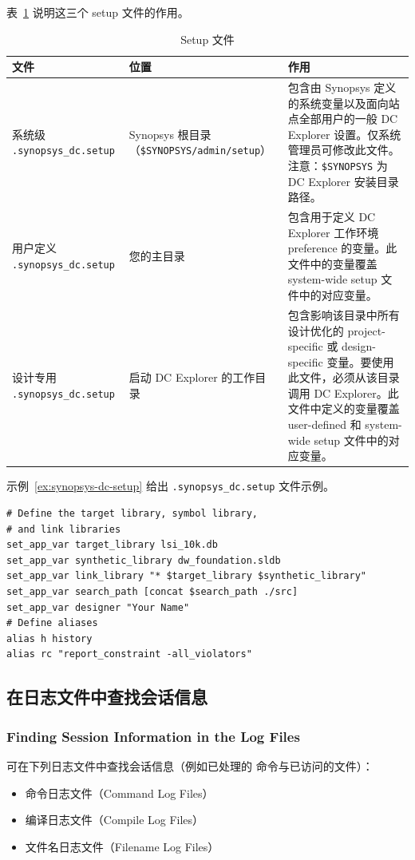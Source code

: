 表~\ref{tab:dce-setup-files} 说明这三个 setup 文件的作用。

\begin{table}[htbp]
\centering
\caption{Setup 文件}
\label{tab:dce-setup-files}
\begin{tabularx}{\textwidth}{@{}l l X@{}}
\toprule
\textbf{文件} & \textbf{位置} & \textbf{作用} \\
\midrule
系统级 \texttt{.synopsys\_dc.setup} &
Synopsys 根目录（\texttt{\$SYNOPSYS/admin/setup}） &
包含由 Synopsys 定义的系统变量以及面向站点全部用户的一般 DC Explorer 设置。仅系统管理员可修改此文件。注意：\texttt{\$SYNOPSYS} 为 DC Explorer 安装目录路径。 \\
用户定义 \texttt{.synopsys\_dc.setup} &
您的主目录 &
包含用于定义 DC Explorer 工作环境 preference 的变量。此文件中的变量覆盖 system-wide setup 文件中的对应变量。 \\
设计专用 \texttt{.synopsys\_dc.setup} &
启动 DC Explorer 的工作目录 &
包含影响该目录中所有设计优化的 project-specific 或 design-specific 变量。要使用此文件，必须从该目录调用 DC Explorer。此文件中定义的变量覆盖 user-defined 和 system-wide setup 文件中的对应变量。 \\
\bottomrule
\end{tabularx}
\end{table}

示例~\ref{ex:synopsys-dc-setup} 给出 \texttt{.synopsys\_dc.setup} 文件示例。

\begin{lstlisting}[caption={.synopsys\_dc.setup 文件},label={ex:synopsys-dc-setup}]
# Define the target library, symbol library,
# and link libraries
set_app_var target_library lsi_10k.db
set_app_var synthetic_library dw_foundation.sldb
set_app_var link_library "* $target_library $synthetic_library"
set_app_var search_path [concat $search_path ./src]
set_app_var designer "Your Name"
# Define aliases
alias h history
alias rc "report_constraint -all_violators"
\end{lstlisting}

\subsection{在日志文件中查找会话信息}
\subsubsection*{Finding Session Information in the Log Files}

可在下列日志文件中查找会话信息（例如已处理的  命令与已访问的文件）：
\begin{itemize}
  \item 命令日志文件（Command Log Files）
  \item 编译日志文件（Compile Log Files）
  \item 文件名日志文件（Filename Log Files）
\end{itemize}

